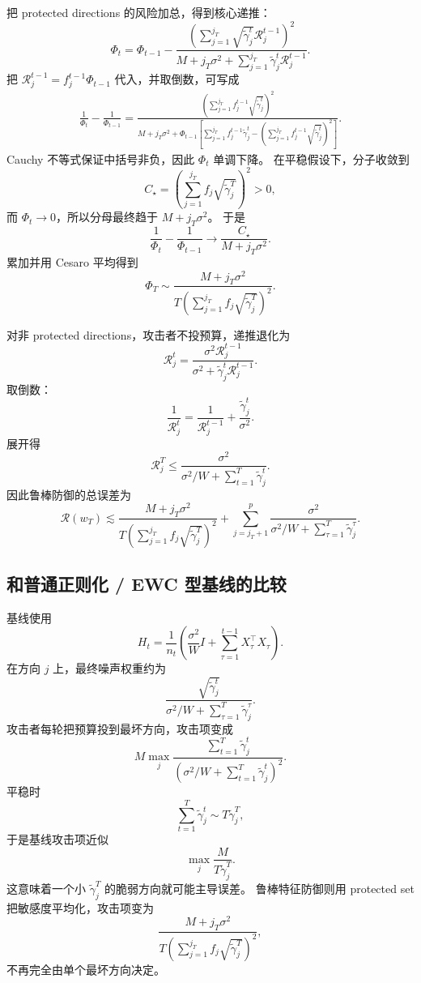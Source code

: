 \documentclass[UTF8,fontset=none,11pt]{ctexart}
\theoremstyle{cnstyle}
\newcommand{\calR}{\mathcal{R}}
\begin{document}
把 protected directions 的风险加总，得到核心递推：
\begin{equation}
  \Phi_t
  =
  \Phi_{t-1}
  -
  \frac{
  \left(
  \sum_{j=1}^{j_T}\sqrt{\tilde\gamma_j^t}\calR_j^{t-1}
  \right)^2
  }{
  M+j_T\sigma^2+
  \sum_{j=1}^{j_T}\tilde\gamma_j^t\calR_j^{t-1}
  } .
  \label{eq:phi-recursion}
\end{equation}
把 \(\calR_j^{t-1}=f_j^{t-1}\Phi_{t-1}\) 代入，并取倒数，可写成
\begin{align}
  \frac{1}{\Phi_t}-\frac{1}{\Phi_{t-1}}
  =
  \frac{
  \left(
  \sum_{j=1}^{j_T}f_j^{t-1}\sqrt{\tilde\gamma_j^t}
  \right)^2
  }{
  M+j_T\sigma^2+
  \Phi_{t-1}
  \left[
  \sum_{j=1}^{j_T}f_j^{t-1}\tilde\gamma_j^t
  -
  \left(
  \sum_{j=1}^{j_T}f_j^{t-1}\sqrt{\tilde\gamma_j^t}
  \right)^2
  \right]
  }.
  \label{eq:phi-reciprocal}
\end{align}
Cauchy 不等式保证中括号非负，因此 \(\Phi_t\) 单调下降。
在平稳假设下，分子收敛到
\[
  C_\star=
  \left(
  \sum_{j=1}^{j_T}f_j\sqrt{\tilde\gamma_j^T}
  \right)^2>0,
\]
而 \(\Phi_t\to0\)，所以分母最终趋于 \(M+j_T\sigma^2\)。
于是
\[
  \frac{1}{\Phi_t}-\frac{1}{\Phi_{t-1}}
  \to
  \frac{C_\star}{M+j_T\sigma^2}.
\]
累加并用 Cesaro 平均得到
\[
  \Phi_T
  \sim
  \frac{M+j_T\sigma^2}
  {T\left(\sum_{j=1}^{j_T}f_j\sqrt{\tilde\gamma_j^T}\right)^2}.
\]

对非 protected directions，攻击者不投预算，递推退化为
\[
  \calR_j^t
  =
  \frac{\sigma^2\calR_j^{t-1}}
  {\sigma^2+\tilde\gamma_j^t\calR_j^{t-1}}.
\]
取倒数：
\[
  \frac{1}{\calR_j^t}
  =
  \frac{1}{\calR_j^{t-1}}
  +\frac{\tilde\gamma_j^t}{\sigma^2}.
\]
展开得
\[
  \calR_j^T
  \le
  \frac{\sigma^2}
  {\sigma^2/W+\sum_{t=1}^T\tilde\gamma_j^t}.
\]
因此鲁棒防御的总误差为
\begin{equation}
  \calR(w_T)
  \lesssim
  \frac{M+j_T\sigma^2}
  {T\left(\sum_{j=1}^{j_T}f_j\sqrt{\tilde\gamma_j^T}\right)^2}
  +
  \sum_{j=j_T+1}^p
  \frac{\sigma^2}
  {\sigma^2/W+\sum_{\tau=1}^T\tilde\gamma_j^\tau}.
  \label{eq:rfd-final}
\end{equation}

\subsection{和普通正则化 / EWC 型基线的比较}

基线使用
\[
  H_t=\frac{1}{n_t}
  \left(
  \frac{\sigma^2}{W}I+\sum_{\tau=1}^{t-1}X_\tau^\top X_\tau
  \right).
\]
在方向 \(j\) 上，最终噪声权重约为
\[
  \frac{\sqrt{\tilde\gamma_j^t}}
  {\sigma^2/W+\sum_{\tau=1}^T\tilde\gamma_j^\tau}.
\]
攻击者每轮把预算投到最坏方向，攻击项变成
\[
  M\max_j
  \frac{\sum_{t=1}^T\tilde\gamma_j^t}
  {\left(\sigma^2/W+\sum_{t=1}^T\tilde\gamma_j^t\right)^2}.
\]
平稳时
\[
  \sum_{t=1}^T\tilde\gamma_j^t\sim T\tilde\gamma_j^T,
\]
于是基线攻击项近似
\[
  \max_j\frac{M}{T\tilde\gamma_j^T}.
\]
这意味着一个小 \(\tilde\gamma_j^T\) 的脆弱方向就可能主导误差。
鲁棒特征防御则用 protected set 把敏感度平均化，攻击项变为
\[
  \frac{M+j_T\sigma^2}
  {T\left(\sum_{j=1}^{j_T}f_j\sqrt{\tilde\gamma_j^T}\right)^2},
\]
不再完全由单个最坏方向决定。
\end{document}
